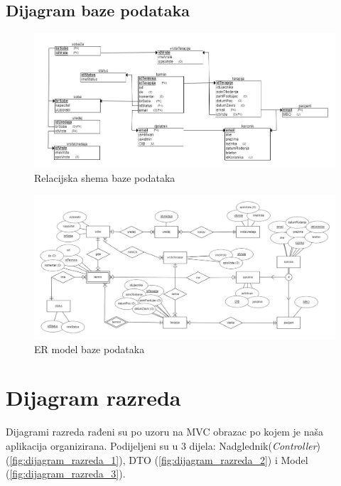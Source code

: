 			
			\subsection{Dijagram baze podataka}
		\begin{figure}[H]
			\includegraphics[width=\textwidth]{slike/Relacijska_shema.JPG} %
			\caption{Relacijska shema baze podataka}
			\label{fig:relacijska_shema1} %
		\end{figure}
		
		\begin{figure}[H]
			\includegraphics[width=\textwidth]{slike/ER_model_BP.JPG} %
			\caption{ER model baze podataka}
			\label{fig:er_model} %
		\end{figure}
			
		\section{Dijagram razreda}
		
			Dijagrami razreda rađeni su po uzoru na MVC obrazac po kojem je naša aplikacija organizirana. Podijeljeni su u 3 dijela: Nadglednik(\textit{Controller}) (\ref{fig:dijagram_razreda_1}), DTO (\ref{fig:dijagram_razreda_2}) i Model (\ref{fig:dijagram_razreda_3}).
			
